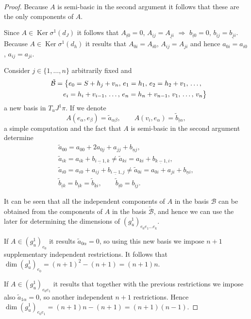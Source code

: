 \begin{proof}
Because $A$ is semi-basic in the second argument it follows that
these are the only components of $A$.

Since $A\in\operatorname{Ker}\sigma^{1}(d_{J})$ it follows that $A_{\underline{i}0}=0$, $A_{\underline{i}j}=A_{\underline{j}i}$ $\Rightarrow$ $b_{\underline{i}0}=0$, $b_{\underline{i}j}=b_{\underline{j}i}$.
Because $A\in\operatorname{Ker}\sigma^{1}(d_{h})$ it results that
$A_{0i}=A_{i0}$, $A_{ij}=A_{ji}$ and hence $a_{0i}=a_{i0}$, $a_{ij}=a_{ji}$.

Consider $j\in \{1,\dots, n\} $ arbitrarily f\/ixed and
\begin{gather*}
\mathcal{\tilde{B}}=\big\{ e_{0}=S+h_{j}+v_{n},\, e_{1}=h_{1},\, e_{2}=h_{2}+v_{1}, \, \dots,\\
 \hphantom{\mathcal{\tilde{B}}=\big\{}{} e_{i}=h_{i}+v_{i-1},\, \dots,\, e_{n}=h_{n}+v_{n-1},\, v_{1},\, \dots,\, v_{n}\big\}
\end{gather*}
 a new basis in $T_{u}J^{1}\pi$. If we denote \[
A(e_{\alpha},e_{\beta})=\tilde{a}_{\alpha\beta},\qquad A(v_{i},e_{\alpha})=\tilde{b}_{\underline{i}\alpha},\]
 a simple computation and the fact that $A$ is semi-basic in the
second argument determine \begin{gather*}
\tilde{a}_{00}   =   a_{00}+2a_{0j}+a_{jj}+b_{\underline{n}j},\\
\tilde{a}_{ik}   =   a_{ik}+b_{\underline{i-1},k}\neq\tilde{a}_{ki}=a_{ki}+b_{\underline{k-1},i},\\
\tilde{a}_{i0}   =   a_{i0}+a_{ij}+b_{\underline{i-1},j}\neq\tilde{a}_{0i}=a_{0i}+a_{ji}+b_{\underline{n}i},\\
\tilde{b}_{\underline{i}k}   =b_{\underline{i}k}   =\tilde{b}_{\underline{k}i},\qquad
\tilde{b}_{\underline{i}0}   =   b_{\underline{i}j}.
\end{gather*}


It can be seen that all the independent components of $A$ in the
basis $\mathcal{B}$ can be obtained from the components of $A$ in
the basis $\mathcal{\tilde{B}}$, and hence we can use the later for
determining the dimensions of $(g_{u}^{1})_{e_{0} e_{1}\dots e_{k}}$.

If $A\in(g_{u}^{1})_{e_{0}}$ it results $\tilde{a}_{0\alpha}=0$,
so using this new basis we impose $n+1$ supplementary independent
restrictions. It follows that $\dim(g_{u}^{1})_{e_{0}}=(n+1)^{2}-(n+1)=(n+1)n$.

If $A\in(g_{u}^{1})_{e_{0} e_{1}}$ it results that together with
the previous restrictions we impose also $\tilde{a}_{1\alpha}=0$,
so another independent $n+1$ restrictions. Hence $\dim (g_{u}^{1})_{e_{0} e_{1}}=(n+1)n-(n+1)=(n+1)(n-1)$.


\end{proof}
